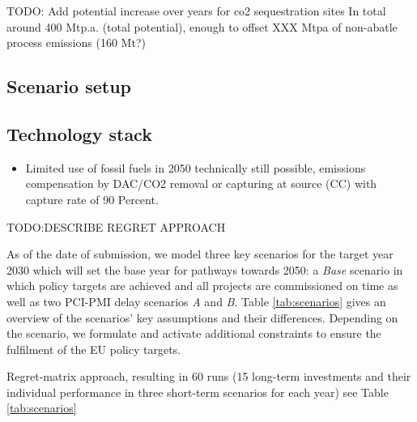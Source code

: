 \documentclass[preprint,12pt,sort&compress]{elsarticle}
\begin{document}
TODO: Add potential increase over years for co2 sequestration sites
In total around 400 Mtp.a. (total potential), enough to offset XXX Mtpa of non-abatle process emissions (160 Mt?)


\subsection{Scenario setup}
\label{sec:scenario_setup}


\subsection{Technology stack}
\label{sec:technology_stack}
\begin{itemize}
  \item Limited use of fossil fuels in 2050 technically still possible, emissions compensation by DAC/CO2 removal or capturing at source (CC) with capture rate of 90 Percent.
\end{itemize}

TODO:DESCRIBE REGRET APPROACH

As of the date of submission, we model three key scenarios for the target year 2030 which will set the base year for pathways towards 2050: a \textit{Base} scenario in which policy targets are achieved and all projects are commissioned on time as well as two PCI-PMI delay scenarios \textit{A} and \textit{B}. Table \ref{tab:scenarios} gives an overview of the scenarios' key assumptions and their differences. Depending on the scenario, we formulate and activate additional constraints to ensure the fulfilment of the EU policy targets.

Regret-matrix approach, resulting in 60 runs (15 long-term investments and their individual performance in three short-term scenarios for each year) see Table \ref{tab:scenarios}
\end{document}
